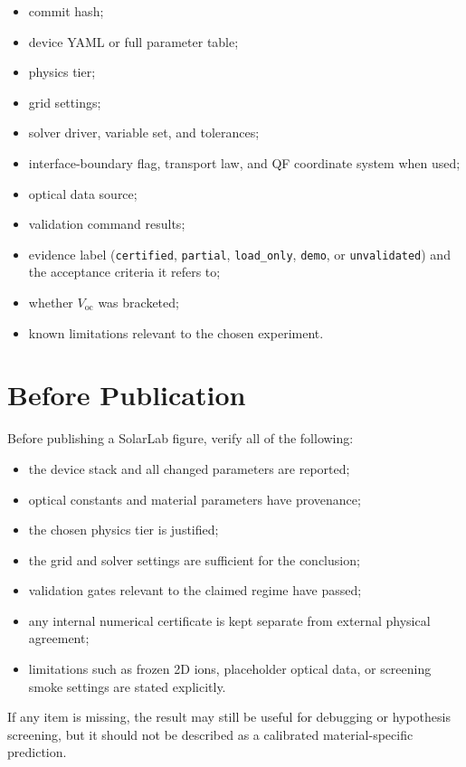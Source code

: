 \documentclass[
  11pt,
  american,
]{report}
\providecommand{\tightlist}{%
  \setlength{\itemsep}{0pt}\setlength{\parskip}{0pt}}
\begin{document}
\begin{itemize}
\tightlist
\item
  commit hash;
\item
  device YAML or full parameter table;
\item
  physics tier;
\item
  grid settings;
\item
  solver driver, variable set, and tolerances;
\item
  interface-boundary flag, transport law, and QF coordinate system when
  used;
\item
  optical data source;
\item
  validation command results;
\item
  evidence label (\texttt{certified}, \texttt{partial},
  \texttt{load\_only}, \texttt{demo}, or \texttt{unvalidated}) and the
  acceptance criteria it refers to;
\item
  whether \(V_\mathrm{oc}\) was bracketed;
\item
  known limitations relevant to the chosen experiment.
\end{itemize}

\hypertarget{before-publication}{%
\section{Before Publication}\label{before-publication}}

Before publishing a SolarLab figure, verify all of the following:

\begin{itemize}
\tightlist
\item
  the device stack and all changed parameters are reported;
\item
  optical constants and material parameters have provenance;
\item
  the chosen physics tier is justified;
\item
  the grid and solver settings are sufficient for the conclusion;
\item
  validation gates relevant to the claimed regime have passed;
\item
  any internal numerical certificate is kept separate from external
  physical agreement;
\item
  limitations such as frozen 2D ions, placeholder optical data, or
  screening smoke settings are stated explicitly.
\end{itemize}

If any item is missing, the result may still be useful for debugging or
hypothesis screening, but it should not be described as a calibrated
material-specific prediction.
\end{document}

